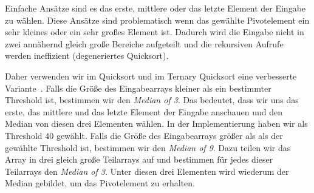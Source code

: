 Einfache Ansätze sind es das erste, mittlere oder das letzte Element der Eingabe zu wählen.
Diese Ansätze sind problematisch wenn das gewählte Pivotelement ein sehr kleines oder ein sehr großes Element ist.
Dadurch wird die Eingabe nicht in zwei annähernd gleich große Bereiche aufgeteilt und die rekursiven Aufrufe werden ineffizient (degeneriertes Quicksort).

Daher verwenden wir im Quicksort und im Ternary Quicksort eine verbesserte Variante~\cite{ternary_quicksort}.
Falls die Größe des Eingabearrays kleiner als ein bestimmter Threshold ist,
bestimmen wir den \emph{Median of 3}. Das bedeutet, dass wir uns das erste,
das mittlere und das letzte Element der Eingabe anschauen und den Median von diesen drei Elementen wählen.
In der Implementierung haben wir als Threshold $40$ gewählt.
Falls die Größe des Eingabearrays größer als als der gewählte Threshold ist,
bestimmen wir den \emph{Median of 9}. Dazu teilen wir das Array in drei gleich große Teilarrays auf
und bestimmen für jedes dieser Teilarrays den \emph{Median of 3}.
Unter diesen drei Elementen wird wiederum der Median gebildet, um das Pivotelement zu erhalten.